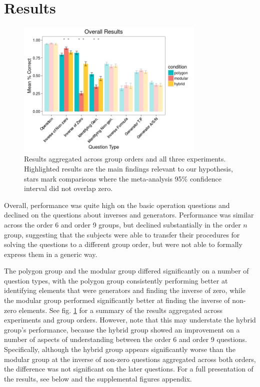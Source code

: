 \documentclass[man,10pt]{apa6}
\begin{document}
\section{Results} %
\begin{figure}
\centering
\includegraphics[width=0.8\textwidth]{figures/overall_results.png}
\caption{Results aggregated across group orders and all three experiments. Highlighted results are the main findings relevant to our hypothesis, stars mark comparisons where the meta-analysis 95\% confidence interval did not overlap zero.}
\label{overall_results}
\end{figure}
Overall, performance was quite high on the basic operation questions and declined on the questions about inverses and generators. Performance was similar across the order 6 and order 9 groups, but declined substantially in the order $n$ group, suggesting that the subjects were able to transfer their procedures for solving the questions to a different group order, but were not able to formally express them in a generic way. \par
The polygon group and the modular group differed significantly on a number of question types, with the polygon group consistently performing better at identifying elements that were generators and finding the inverse of zero, while the modular group performed significantly better at finding the inverse of non-zero elements. See fig. \ref{overall_results} for a summary of the results aggregated across experiments and group orders. However, note that this may understate the hybrid group's performance, because the hybrid group showed an improvement on a number of aspects of understanding between the order 6 and order 9 questions. Specifically, although the hybrid group appears significantly worse than the modular group at the inverse of non-zero questions aggregated across both orders, the difference was not significant on the later questions. For a full presentation of the results, see below and the supplemental figures appendix.  
\FloatBarrier
\end{document}
